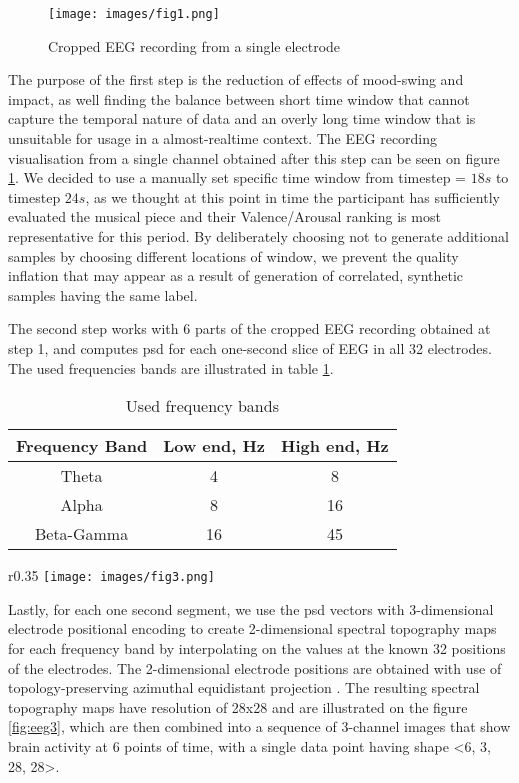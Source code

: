 \documentclass[14pt]{extreport}
\begin{document}
\begin{figure}[h!]
\centering
\texttt{[image: images/fig1.png]}
\caption{Cropped EEG recording from a single electrode}
\label{fig:eeg1}
\end{figure}

The purpose of the first step is the reduction of effects of mood-swing and impact, as well finding the balance between short time window that cannot capture the temporal nature of data and an overly long time window that is unsuitable for usage in a almost-realtime context. The EEG recording visualisation from a single channel obtained after this step can be seen on figure \ref{fig:eeg1}. We decided to use a manually set specific time window from timestep = $18s$ to timestep $24s$, as we thought at this point in time the participant has sufficiently evaluated the musical piece and their Valence/Arousal ranking is most representative for this period. By deliberately choosing not to generate additional samples by choosing different locations of window, we prevent the quality inflation that may appear as a result of generation of correlated, synthetic samples having the same label.

The second step works with 6 parts of the cropped EEG recording obtained at step 1, and computes \acrfull{psd} for each one-second slice of EEG in all 32 electrodes. The used frequencies bands are illustrated in table \ref{table:1}.

\begin{table}[h!]
    \centering
\begin{tabular}{|c|c|c|}
\hline
    Frequency Band & Low end, Hz & High end, Hz \\
    \hline
    Theta & 4 & 8 \\ 
    Alpha & 8 & 16 \\ 
    Beta-Gamma & 16 & 45 \\
\hline
\end{tabular}
    \caption{Used frequency bands}
    \label{table:1}
\end{table}

\begin{wrapfigure}{r}{0.35\textwidth}
    \centering
\texttt{[image: images/fig3.png]}
\caption{Spectral topography map sampled from 1 second of EEG recording displayed on 28x28 grid}
\label{fig:eeg3}
\end{wrapfigure}

Lastly, for each one second segment, we use the \acrshort{psd} vectors with 3-dimensional electrode positional encoding to create 2-dimensional spectral topography maps for each frequency band by interpolating on the values at the known 32 positions of the electrodes. The 2-dimensional electrode positions are obtained with use of topology-preserving azimuthal equidistant projection \cite{bashivan}. The resulting spectral topography maps have resolution of 28x28 and are illustrated on the figure \ref{fig:eeg3}, which are then combined into a sequence of 3-channel images that show brain activity at 6 points of time, with a single data point having shape <6, 3, 28, 28>.
\end{document}
